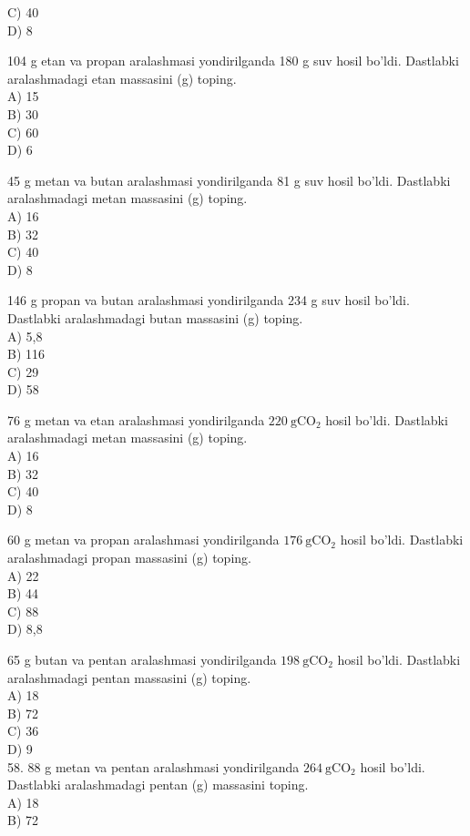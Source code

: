 C) 40\\
D) 8
  \item 104 g etan va propan aralashmasi yondirilganda 180 g suv hosil bo'ldi. Dastlabki aralashmadagi etan massasini (g) toping.\\
A) 15\\
B) 30\\
C) 60\\
D) 6
  \item 45 g metan va butan aralashmasi yondirilganda 81 g suv hosil bo'ldi. Dastlabki aralashmadagi metan massasini (g) toping.\\
A) 16\\
B) 32\\
C) 40\\
D) 8
  \item 146 g propan va butan aralashmasi yondirilganda 234 g suv hosil bo'ldi. Dastlabki aralashmadagi butan massasini (g) toping.\\
A) 5,8\\
B) 116\\
C) 29\\
D) 58
  \item 76 g metan va etan aralashmasi yondirilganda $220 \mathrm{~g} \mathrm{CO}_{2}$ hosil bo'ldi. Dastlabki aralashmadagi metan massasini (g) toping.\\
A) 16\\
B) 32\\
C) 40\\
D) 8
  \item 60 g metan va propan aralashmasi yondirilganda $176 \mathrm{~g} \mathrm{CO}_{2}$ hosil bo'ldi. Dastlabki aralashmadagi propan massasini (g) toping.\\
A) 22\\
B) 44\\
C) 88\\
D) 8,8
  \item 65 g butan va pentan aralashmasi yondirilganda $198 \mathrm{~g} \mathrm{CO}_{2}$ hosil bo'ldi.
Dastlabki aralashmadagi pentan massasini (g) toping.\\
A) 18\\
B) 72\\
C) 36\\
D) 9\\
58. 88 g metan va pentan aralashmasi yondirilganda $264 \mathrm{~g} \mathrm{CO}_{2}$ hosil bo'ldi. Dastlabki aralashmadagi pentan (g) massasini toping.\\
A) 18\\
B) 72\\
